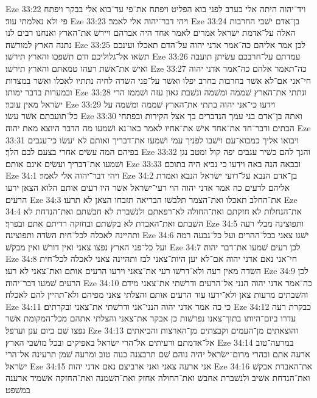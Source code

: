 Eze 33:22  ויד־יהוה היתה אלי בערב לפני בוא הפליט ויפתח את־פי עד־בוא אלי בבקר ויפתח פי ולא נאלמתי עוד׃
Eze 33:23  ויהי דבר־יהוה אלי לאמר׃
Eze 33:24  בן־אדם ישׁבי החרבות האלה על־אדמת ישׂראל אמרים לאמר אחד היה אברהם ויירשׁ את־הארץ ואנחנו רבים לנו נתנה הארץ למורשׁה׃
Eze 33:25  לכן אמר אליהם כה־אמר אדני יהוה על־הדם תאכלו ועינכם תשׂאו אל־גלוליכם ודם תשׁפכו והארץ תירשׁו׃
Eze 33:26  עמדתם על־חרבכם עשׂיתן תועבה ואישׁ את־אשׁת רעהו טמאתם והארץ תירשׁו׃
Eze 33:27  כה־תאמר אלהם כה־אמר אדני יהוה חי־אני אם־לא אשׁר בחרבות בחרב יפלו ואשׁר על־פני השׂדה לחיה נתתיו לאכלו ואשׁר במצדות ובמערות בדבר ימותו׃
Eze 33:28  ונתתי את־הארץ שׁממה ומשׁמה ונשׁבת גאון עזה ושׁממו הרי ישׂראל מאין עובר׃
Eze 33:29  וידעו כי־אני יהוה בתתי את־הארץ שׁממה ומשׁמה על כל־תועבתם אשׁר עשׂו׃
Eze 33:30  ואתה בן־אדם בני עמך הנדברים בך אצל הקירות ובפתחי הבתים ודבר־חד את־אחד אישׁ את־אחיו לאמר באו־נא ושׁמעו מה הדבר היוצא מאת יהוה׃
Eze 33:31  ויבואו אליך כמבוא־עם וישׁבו לפניך עמי ושׁמעו את־דבריך ואותם לא יעשׂו כי־עגבים בפיהם המה עשׂים אחרי בצעם לבם הלך׃
Eze 33:32  והנך להם כשׁיר עגבים יפה קול ומטב נגן ושׁמעו את־דבריך ועשׂים אינם אותם׃
Eze 33:33  ובבאה הנה באה וידעו כי נביא היה בתוכם׃
Eze 34:1  ויהי דבר־יהוה אלי לאמר׃
Eze 34:2  בן־אדם הנבא על־רועי ישׂראל הנבא ואמרת אליהם לרעים כה אמר אדני יהוה הוי רעי־ישׂראל אשׁר היו רעים אותם הלוא הצאן ירעו הרעים׃
Eze 34:3  את־החלב תאכלו ואת־הצמר תלבשׁו הבריאה תזבחו הצאן לא תרעו׃
Eze 34:4  את־הנחלות לא חזקתם ואת־החולה לא־רפאתם ולנשׁברת לא חבשׁתם ואת־הנדחת לא השׁבתם ואת־האבדת לא בקשׁתם ובחזקה רדיתם אתם ובפרך׃
Eze 34:5  ותפוצינה מבלי רעה ותהיינה לאכלה לכל־חית השׂדה ותפוצינה׃
Eze 34:6  ישׁגו צאני בכל־ההרים ועל כל־גבעה רמה ועל כל־פני הארץ נפצו צאני ואין דורשׁ ואין מבקשׁ׃
Eze 34:7  לכן רעים שׁמעו את־דבר יהוה׃
Eze 34:8  חי־אני נאם אדני יהוה אם־לא יען היות־צאני לבז ותהיינה צאני לאכלה לכל־חית השׂדה מאין רעה ולא־דרשׁו רעי את־צאני וירעו הרעים אותם ואת־צאני לא רעו׃
Eze 34:9  לכן הרעים שׁמעו דבר־יהוה׃
Eze 34:10  כה־אמר אדני יהוה הנני אל־הרעים ודרשׁתי את־צאני מידם והשׁבתים מרעות צאן ולא־ירעו עוד הרעים אותם והצלתי צאני מפיהם ולא־תהיין להם לאכלה׃
Eze 34:11  כי כה אמר אדני יהוה הנני־אני ודרשׁתי את־צאני ובקרתים׃
Eze 34:12  כבקרת רעה עדרו ביום־היותו בתוך־צאנו נפרשׁות כן אבקר את־צאני והצלתי אתהם מכל־המקומת אשׁר נפצו שׁם ביום ענן וערפל׃
Eze 34:13  והוצאתים מן־העמים וקבצתים מן־הארצות והביאתים אל־אדמתם ורעיתים אל־הרי ישׂראל באפיקים ובכל מושׁבי הארץ׃
Eze 34:14  במרעה־טוב ארעה אתם ובהרי מרום־ישׂראל יהיה נוהם שׁם תרבצנה בנוה טוב ומרעה שׁמן תרעינה אל־הרי ישׂראל׃
Eze 34:15  אני ארעה צאני ואני ארביצם נאם אדני יהוה׃
Eze 34:16  את־האבדת אבקשׁ ואת־הנדחת אשׁיב ולנשׁברת אחבשׁ ואת־החולה אחזק ואת־השׁמנה ואת־החזקה אשׁמיד ארענה במשׁפט׃
